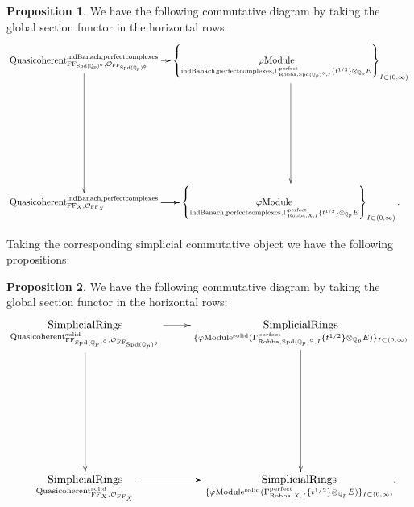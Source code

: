 \documentclass[12pt]{book}
\theoremstyle{definition}
\newtheorem{proposition}{Proposition}
\begin{document}
\begin{proposition}
We have the following commutative diagram by taking the global section functor in the horizontal rows:
\[\displayindent=+0in
\xymatrix@C-0.2in@R+7pc{
\mathrm{Quasicoherent}^{\mathrm{indBanach,perfectcomplexes}}_{\mathrm{FF}_{\mathrm{Spd}(\mathbb{Q}_p)^\diamond},\mathcal{O}_{\mathrm{FF}_{\mathrm{Spd}(\mathbb{Q}_p)^\diamond}}} \ar[d]\ar[r] &\left\{\underset{\mathrm{indBanach,perfectcomplexes},\Gamma^\text{perfect}_{\text{Robba},\mathrm{Spd}(\mathbb{Q}_p)^\diamond,I}\{t^{1/2}\}\otimes_{\mathbb{Q}_p}E}{\varphi\mathrm{Module}}\right\}_{I\subset (0,\infty)}\ar[d]\\
\mathrm{Quasicoherent}^{\mathrm{indBanach,perfectcomplexes}}_{\mathrm{FF}_X,\mathcal{O}_{\mathrm{FF}_X}}  \ar[r] \ar[r] \ar[r] &\left\{\underset{\mathrm{indBanach,perfectcomplexes},\Gamma^\text{perfect}_{\text{Robba},X,I}\{t^{1/2}\}\otimes_{\mathbb{Q}_p}E}{\varphi\mathrm{Module}}\right\}_{I\subset (0,\infty)}.    
}
\]

\end{proposition}


\indent Taking the corresponding simplicial commutative object we have the following propositions:

\begin{proposition}
We have the following commutative diagram by taking the global section functor in the horizontal rows:
\[\displayindent=+0in
\xymatrix@R+7pc{
\underset{\mathrm{Quasicoherent}^{\mathrm{solid}}_{\mathrm{FF}_{\mathrm{Spd}(\mathbb{Q}_p)^\diamond},\mathcal{O}_{\mathrm{FF}_{\mathrm{Spd}(\mathbb{Q}_p)^\diamond}}}}{\mathrm{SimplicialRings}} \ar[d] \ar[r] &\underset{\{\varphi\mathrm{Module}^{\mathrm{solid}}(\Gamma^\text{perfect}_{\text{Robba},{\mathrm{Spd}(\mathbb{Q}_p)^\diamond},I}\{t^{1/2}\}\otimes_{\mathbb{Q}_p}E)\}_{I\subset (0,\infty)}}{\mathrm{SimplicialRings}} \ar[d]\\
\underset{\mathrm{Quasicoherent}^{\mathrm{solid}}_{\mathrm{FF}_X,\mathcal{O}_{\mathrm{FF}_X}}}{\mathrm{SimplicialRings}}  \ar[r] \ar[r] \ar[r] &\underset{\{\varphi\mathrm{Module}^{\mathrm{solid}}(\Gamma^\text{perfect}_{\text{Robba},X,I}\{t^{1/2}\}\otimes_{\mathbb{Q}_p}E)\}_{I\subset (0,\infty)}}{\mathrm{SimplicialRings}}.
}
\]
\end{proposition}
\end{document}
